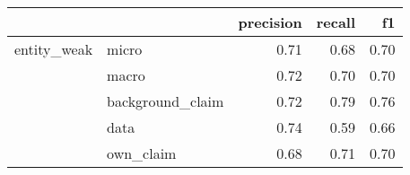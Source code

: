 \begin{tabular}{llrrr}
\toprule
            &           &  precision &  recall &   f1 \\
\midrule
entity\_weak & micro &       0.71 &    0.68 & 0.70 \\
            & macro &       0.72 &    0.70 & 0.70 \\
            & background\_claim &       0.72 &    0.79 & 0.76 \\
            & data &       0.74 &    0.59 & 0.66 \\
            & own\_claim &       0.68 &    0.71 & 0.70 \\
\bottomrule
\end{tabular}
